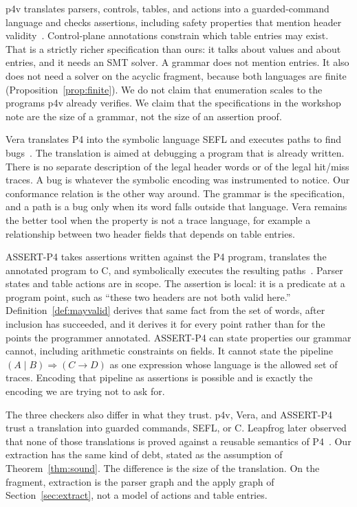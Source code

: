 \documentclass[a4paper,UKenglish,cleveref,autoref]{lipics-v2021}
\begin{document}
p4v translates parsers, controls, tables, and actions into a guarded-command language and checks assertions, including safety properties that mention header validity~\cite{p4v}.
Control-plane annotations constrain which table entries may exist.
That is a strictly richer specification than ours: it talks about values and about entries, and it needs an SMT solver.
A grammar does not mention entries.
It also does not need a solver on the acyclic fragment, because both languages are finite (Proposition~\ref{prop:finite}).
We do not claim that enumeration scales to the programs p4v already verifies.
We claim that the specifications in the workshop note are the size of a grammar, not the size of an assertion proof.

Vera translates P4 into the symbolic language SEFL and executes paths to find bugs~\cite{vera}.
The translation is aimed at debugging a program that is already written.
There is no separate description of the legal header words or of the legal hit/miss traces.
A bug is whatever the symbolic encoding was instrumented to notice.
Our conformance relation is the other way around.
The grammar is the specification, and a path is a bug only when its word falls outside that language.
Vera remains the better tool when the property is not a trace language, for example a relationship between two header fields that depends on table entries.

ASSERT-P4 takes assertions written against the P4 program, translates the annotated program to C, and symbolically executes the resulting paths~\cite{assertp4}.
Parser states and table actions are in scope.
The assertion is local: it is a predicate at a program point, such as ``these two headers are not both valid here.''
Definition~\ref{def:mayvalid} derives that same fact from the set of words, after inclusion has succeeded, and it derives it for every point rather than for the points the programmer annotated.
ASSERT-P4 can state properties our grammar cannot, including arithmetic constraints on fields.
It cannot state the pipeline \((A \mid B) \Rightarrow (C \rightarrow D)\) as one expression whose language is the allowed set of traces.
Encoding that pipeline as assertions is possible and is exactly the encoding we are trying not to ask for.

The three checkers also differ in what they trust.
p4v, Vera, and ASSERT-P4 trust a translation into guarded commands, SEFL, or C.
Leapfrog later observed that none of those translations is proved against a reusable semantics of P4~\cite{leapfrog}.
Our extraction has the same kind of debt, stated as the assumption of Theorem~\ref{thm:sound}.
The difference is the size of the translation.
On the fragment, extraction is the parser graph and the apply graph of Section~\ref{sec:extract}, not a model of actions and table entries.
\end{document}
